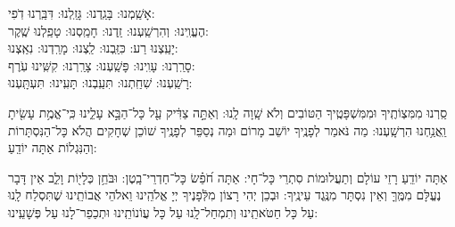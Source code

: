 \documentclass[twoside, openany, parskip=half, 11pt]{book}
\begin{document}
			אָשַֽׁמְנוּ: 	בָּגַֽדְנוּ: 	גָּזַֽלְנוּ: 	דִּבַּֽרְנוּ דֹֽפִי: \\
		הֶעֱוִֽינוּ: 	וְהִרְשַֽׁעְנוּ: 	זַֽדְנוּ: 		חָמַֽסְנוּ: 	טָפַֽלְנוּ שֶֽׁקֶר:\\
		יָעַֽצְנוּ רַע: 	כִּזַּֽבְנוּ: 	לַֽצְנוּ: 	מָרַֽדְנוּ: 	נִאַֽצְנוּ: \\	
		סָרַֽרְנוּ: 	עָוִֽינוּ: 	פָּשַֽׁעְנוּ: 	צָרַֽרְנוּ: 	קִשִּֽׁינוּ עֹֽרֶף:\\ 
		רָשַֽׁעְנוּ: 	שִׁחַֽתְנוּ: 	תִּעַֽבְנוּ: 	תָּעִֽינוּ: 	תִּעְתָּֽעְנוּ: 

 סַֽרְנוּ מִמִּצְוֹתֶֽיךָ וּמִמִּשְׁפָּטֶֽיךָ הַטּוֹבִים וְלֹא שָֽׁוָה לָֽנוּ: וְאַתָּ֣ה צַדִּ֔יק עַ֖ל כָּל־הַבָּ֣א עָלֵ֑ינוּ כִּֽי־אֱמֶ֥ת עָשִׂ֖יתָ וַֽאֲנַ֥חְנוּ הִרְשָֽׁעְנוּ: מַה נֹּאמַר לְפָנֶֽיךָ יוֹשֵׁב מָרוֹם וּמַה נְסַפֵּר לְפָנֶֽיךָ שׁוֹכֵן שְׁחָקִים הֲלֹא כָּל־הַנִּסְתָּרוֹת וְהַנִּגְלוֹת אַתָּה יוֹדֵֽעַ:
 
אַתָּה יוֹדֵֽעַ רָזֵי עוֹלָם וְתַעֲלוּמוֹת סִתְרֵי כָּל־חָי: אַתָּה חֹ֝פֵ֗שׂ כָּל־חַדְרֵי־בָֽטֶן: וּבֹּחֵ֥ן כְּלָי֖וֹת וָלֵ֑ב אֵין דָּבָר נֶעֱלָּם מִמֶּֽךָּ וְאֵין נִסְתָּר מִנֶּֽגֶד עֵינֶֽיךָ: וּבְכֵן יְהִי רָצוֹן מִלְּֿפָנֶיךָ יְיָ אֱלֹהֵֽינוּ וֵאלֹהֵי אֲבוֹתֵֽינוּ שֶׁתִּסְלַח לָֽנוּ עַל כָּל חַטֹּאתֵֽינוּ וְתִמְחַל־לָֽנוּ עַל כָּל עֲוֹנוֹתֵֽינוּ וּתְכַפֵר־לָנוּ עַל פְּשָׁעֵֽינוּ:
\end{document}
